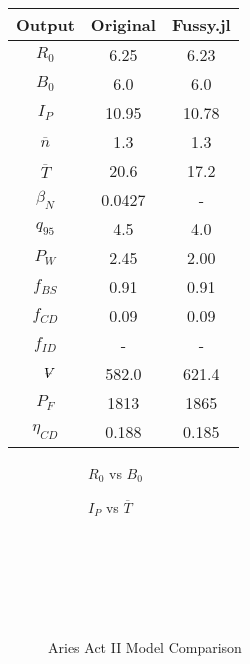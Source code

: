 \begin{table}[h!]
\begin{subtable}[t]{0.5\textwidth}
\begin{tabular}{ c|c|c }
Output           & Original         & Fussy.jl        \\
\hline
$R_{0}$          & 6.25             & 6.23           \\
$B_{0}$          & 6.0              & 6.0           \\
$I_{P}$          & 10.95            & 10.78           \\
$\overline n$    & 1.3              & 1.3           \\
$\overline T$    & 20.6             & 17.2            \\
$\beta_{N}$       & 0.0427           & -          \\
$q_{95}$         & 4.5              & 4.0           \\
$P_{W}$          & 2.45             & 2.00           \\
$f_{BS}$         & 0.91             & 0.91           \\
$f_{CD}$         & 0.09             & 0.09           \\
$f_{ID}$         & -              & -             \\
$\volume$         & 582.0            & 621.4           \\
$P_{F}$          & 1813           & 1865          \\
$\eta_{CD}$      & 0.188            & 0.185          \\

\end{tabular}
\end{subtable}
\hfill
\hfill
\label{table:act_1}
\end{table}

\clearpage

\newpage

\begin{figure*}[h!]
    \centering
    \hfill 
    \begin{subfigure}[t]{0.45\textwidth}
        \centering
    \begin{adjustbox}{width=\textwidth}
      \Large
      
    \end{adjustbox}
        \caption{$R_0$ vs $B_0$}
    \end{subfigure}
    \hfill
    \begin{subfigure}[t]{0.45\textwidth}
        \centering
    \begin{adjustbox}{width=\textwidth}
      \Large
      
    \end{adjustbox}
        \caption{$I_P$ vs $\overline T$}
    \end{subfigure}
    \hfill \hfill ~\\ ~\\ ~\\
    \caption{Aries Act II Model Comparison} ~\\
    \label{fig:act_2_comparison}
\end{figure*}

